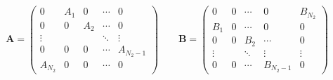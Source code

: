 \begin{equation}
\mathbf{A} = 
\left( 
\begin{array}{ccccc}  
0 & A_1 & 0 & \cdots & 0  \\
0 & 0 & A_2 & \cdots & 0  \\ 
\vdots & & & \ddots  & \vdots \\
0 & 0 & 0 & \cdots   & A_{N_2-1}  \\
A_{N_2} & 0 & 0 & \cdots   & 0
\end{array}
\right)
\qquad
\mathbf{B} = 
\left( 
\begin{array}{ccccc}  
0      & 0 & \cdots &   0        & B_{N_2}  \\
B_1    & 0 & \cdots &   0        & 0 \\ 
0      & 0 & B_2    & \cdots     & 0  \\ 
\vdots &   & \ddots & \vdots     & \vdots \\
0      & 0 & \cdots & B_{N_2-1}  & 0
\end{array}
\right) 
\end{equation}

